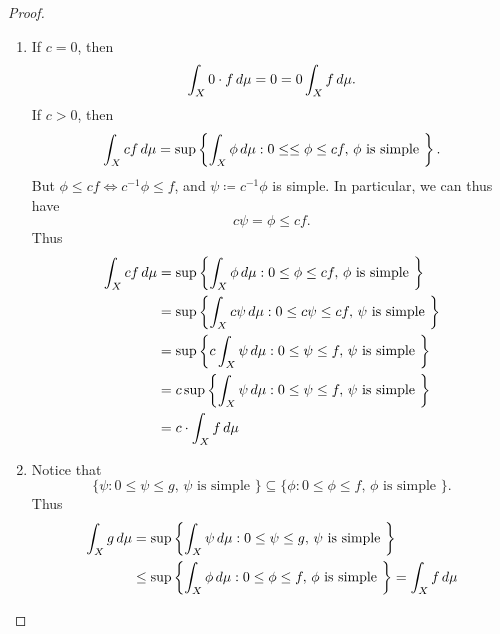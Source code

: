\documentclass[notoc,notitlepage]{tufte-book}
\begin{document}
\begin{proof}
  \begin{enumerate}
    \item If $c = 0$, then
      \begin{equation*}
        \int_{X} 0 \cdot f \mathop{}\!d{\mu} = 0 = 0 \int_{X} f \mathop{}\!d{\mu}. 
      \end{equation*}
      If $c > 0$, then
      \begin{equation*}
        \int_{X} cf \mathop{}\!d{\mu}
        = \sup \left\{ \int_{X} \phi \mathop{}\!d{\mu}
                : 0 \leq \leq \phi \leq cf,\, \phi \text{ is simple } \right\}.
      \end{equation*}
      But $\phi \leq cf \iff c^{-1} \phi \leq f$,
      and $\psi \coloneqq c^{-1} \phi$ is simple.
      In particular, we can thus have
      \begin{equation*}
        c \psi = \phi \leq c f.
      \end{equation*}
      Thus
      \begin{align*}
        \int_{X} cf \mathop{}\!d{\mu}
        &= \sup \left\{ \int_{X} \phi \mathop{}\!d{\mu}
              : 0 \leq \phi \leq cf,\, \phi \text{ is simple } \right\} \\
        &= \sup \left\{ \int_{X} c \psi \mathop{}\!d{\mu}
              : 0 \leq c \psi \leq cf,\, \psi \text{ is simple } \right\} \\
        &= \sup \left\{ c \int_{X} \psi \mathop{}\!d{\mu}
              : 0 \leq \psi \leq f,\, \psi \text{ is simple } \right\} \\
        &= c \sup \left\{ \int_{X} \psi \mathop{}\!d{\mu}
              : 0 \leq \psi \leq f,\, \psi \text{ is simple } \right\} \\
        &= c \cdot \int_{X} f \mathop{}\!d{\mu}
      \end{align*}

    \item Notice that
      \begin{equation*}
        \{ \psi : 0 \leq \psi \leq g,\, \psi \text{ is simple } \} \subseteq
        \{ \phi : 0 \leq \phi \leq f,\, \phi \text{ is simple } \}.
      \end{equation*}
      Thus
      \begin{align*}
        \int_{X} g \mathop{}\!d{\mu}
        &= \sup \left\{ \int_{X} \psi \mathop{}\!d{\mu}
              : 0 \leq \psi \leq g,\, \psi \text{ is simple }\right\} \\
        &\leq \sup \left\{ \int_{X} \phi \mathop{}\!d{\mu}
              : 0 \leq \phi \leq f,\, \phi \text{ is simple } \right\}
         = \int_{X} f \mathop{}\!d{\mu}
      \end{align*}
  \end{enumerate}
\end{proof}
\end{document}
